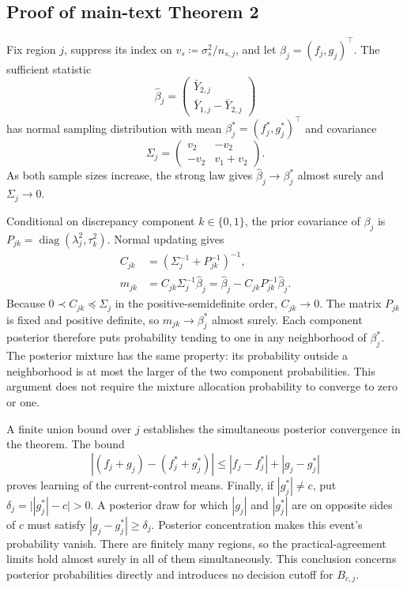 \subsection{Proof of main-text Theorem 2}\label{sec:C.2}
Fix region $j$, suppress its index on $v_s\coloneqq\sigma_s^2/n_{s,j}$, and let $\beta_j=(f_j,g_j)^\top$. The sufficient statistic
\begin{equation}\label{eq:regional_sufficient}
\widehat\beta_j=
\begin{pmatrix}\bar Y_{2,j}\\\bar Y_{1,j}-\bar Y_{2,j}\end{pmatrix}
\end{equation}
has normal sampling distribution with mean $\beta_j^*=(f_j^*,g_j^*)^\top$ and covariance
\begin{equation}\label{eq:regional_sampling_covariance}
\Sigma_j=\begin{pmatrix}v_2&-v_2\\-v_2&v_1+v_2\end{pmatrix}.
\end{equation}
As both sample sizes increase, the strong law gives $\widehat\beta_j\to\beta_j^*$ almost surely and $\Sigma_j\to0$.

Conditional on discrepancy component $k\in\{0,1\}$, the prior covariance of $\beta_j$ is $P_{jk}=\operatorname{diag}(\lambda_j^2,\tau_k^2)$. Normal updating gives
\begin{equation}\label{eq:regional_posterior}
\begin{aligned}
C_{jk}&=(\Sigma_j^{-1}+P_{jk}^{-1})^{-1},\\
m_{jk}&=C_{jk}\Sigma_j^{-1}\widehat\beta_j
=\widehat\beta_j-C_{jk}P_{jk}^{-1}\widehat\beta_j.
\end{aligned}
\end{equation}
Because $0\prec C_{jk}\preceq\Sigma_j$ in the positive-semidefinite order, $C_{jk}\to0$. The matrix $P_{jk}$ is fixed and positive definite, so $m_{jk}\to\beta_j^*$ almost surely. Each component posterior therefore puts probability tending to one in any neighborhood of $\beta_j^*$. The posterior mixture has the same property: its probability outside a neighborhood is at most the larger of the two component probabilities. This argument does not require the mixture allocation probability to converge to zero or one.

A finite union bound over $j$ establishes the simultaneous posterior convergence in the theorem. The bound
\[
|(f_j+g_j)-(f_j^*+g_j^*)|\leq|f_j-f_j^*|+|g_j-g_j^*|
\]
proves learning of the current-control means. Finally, if $|g_j^*|\ne c$, put $\delta_j=\bigl||g_j^*|-c\bigr|>0$. A posterior draw for which $|g_j|$ and $|g_j^*|$ are on opposite sides of $c$ must satisfy $|g_j-g_j^*|\geq\delta_j$. Posterior concentration makes this event's probability vanish. There are finitely many regions, so the practical-agreement limits hold almost surely in all of them simultaneously. This conclusion concerns posterior probabilities directly and introduces no decision cutoff for $B_{c,j}$.


